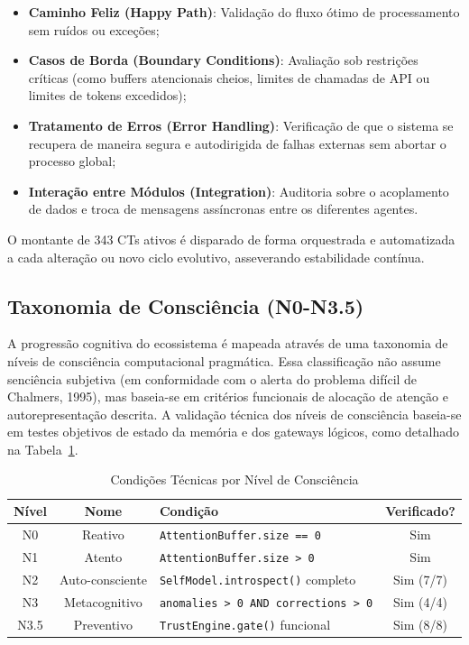 \documentclass[12pt,a4paper,oneside]{abntex2}
\begin{document}
\begin{itemize}
    \item \textbf{Caminho Feliz (Happy Path)}: Validação do fluxo ótimo de processamento sem ruídos ou exceções;
    \item \textbf{Casos de Borda (Boundary Conditions)}: Avaliação sob restrições críticas (como buffers atencionais cheios, limites de chamadas de API ou limites de tokens excedidos);
    \item \textbf{Tratamento de Erros (Error Handling)}: Verificação de que o sistema se recupera de maneira segura e autodirigida de falhas externas sem abortar o processo global;
    \item \textbf{Interação entre Módulos (Integration)}: Auditoria sobre o acoplamento de dados e troca de mensagens assíncronas entre os diferentes agentes.
\end{itemize}

O montante de 343 CTs ativos é disparado de forma orquestrada e automatizada a cada alteração ou novo ciclo evolutivo, asseverando estabilidade contínua.

\subsection{Taxonomia de Consciência (N0-N3.5)}

A progressão cognitiva do ecossistema é mapeada através de uma taxonomia de níveis de consciência computacional pragmática. Essa classificação não assume senciência subjetiva (em conformidade com o alerta do problema difícil de Chalmers, 1995), mas baseia-se em critérios funcionais de alocação de atenção e autorepresentação descrita. A validação técnica dos níveis de consciência baseia-se em testes objetivos de estado da memória e dos gateways lógicos, como detalhado na Tabela~\ref{tab:taxonomia}.

\begin{table}[H]
\centering
\caption{Condições Técnicas por Nível de Consciência}
\label{tab:taxonomia}
\begin{tabular}{cclc}
\toprule
\textbf{Nível} & \textbf{Nome} & \textbf{Condição} & \textbf{Verificado?} \\
\midrule
N0 & Reativo & \texttt{AttentionBuffer.size == 0} & Sim \\
N1 & Atento & \texttt{AttentionBuffer.size > 0} & Sim \\
N2 & Auto-consciente & \texttt{SelfModel.introspect()} completo & Sim (7/7) \\
N3 & Metacognitivo & \texttt{anomalies > 0 AND corrections > 0} & Sim (4/4) \\
N3.5 & Preventivo & \texttt{TrustEngine.gate()} funcional & Sim (8/8) \\
\bottomrule
\end{tabular}
\end{table}
\end{document}
